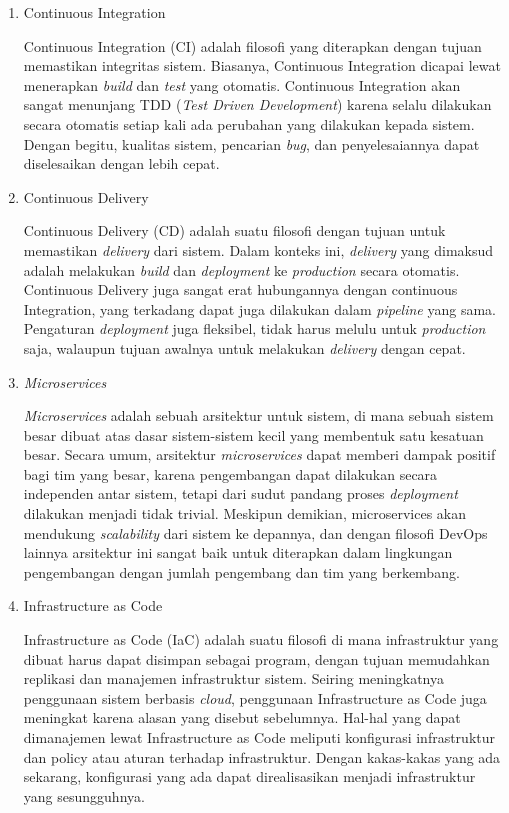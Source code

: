 \begin{enumerate}
  \item Continuous Integration
  
  Continuous Integration (CI) adalah filosofi yang diterapkan dengan tujuan memastikan integritas sistem.
  Biasanya, Continuous Integration dicapai lewat menerapkan \textit{build} dan \textit{test} yang otomatis.
  Continuous Integration akan sangat menunjang TDD (\textit{Test Driven Development}) karena selalu dilakukan secara otomatis setiap kali ada perubahan yang dilakukan kepada sistem.
  Dengan begitu, kualitas sistem, pencarian \textit{bug}, dan penyelesaiannya dapat diselesaikan dengan lebih cepat.

  \item Continuous Delivery
  
  Continuous Delivery (CD) adalah suatu filosofi dengan tujuan untuk memastikan \textit{delivery} dari sistem.
  Dalam konteks ini, \textit{delivery} yang dimaksud adalah melakukan \textit{build} dan \textit{deployment} ke \textit{production} secara otomatis.
  Continuous Delivery juga sangat erat hubungannya dengan continuous Integration, yang terkadang dapat juga dilakukan dalam \textit{pipeline} yang sama.
  Pengaturan \textit{deployment} juga fleksibel, tidak harus melulu untuk \textit{production} saja, walaupun tujuan awalnya untuk melakukan \textit{delivery} dengan cepat.

  \item \textit{Microservices}
  
  \textit{Microservices} adalah sebuah arsitektur untuk sistem, di mana sebuah sistem besar dibuat atas dasar sistem-sistem kecil yang membentuk satu kesatuan besar.
  Secara umum, arsitektur \textit{microservices} dapat memberi dampak positif bagi tim yang besar, karena pengembangan dapat dilakukan secara independen antar sistem, tetapi dari sudut pandang proses \textit{deployment} dilakukan menjadi tidak trivial.
  Meskipun demikian, microservices akan mendukung \textit{scalability} dari sistem ke depannya, dan dengan filosofi DevOps lainnya arsitektur ini sangat baik untuk diterapkan dalam lingkungan pengembangan dengan jumlah pengembang dan tim yang berkembang.

  \item Infrastructure as Code
  
  Infrastructure as Code (IaC) adalah suatu filosofi di mana infrastruktur yang dibuat harus dapat disimpan sebagai program, dengan tujuan memudahkan replikasi dan manajemen infrastruktur sistem.
  Seiring meningkatnya penggunaan sistem berbasis \textit{cloud}, penggunaan Infrastructure as Code juga meningkat karena alasan yang disebut sebelumnya.
  Hal-hal yang dapat dimanajemen lewat Infrastructure as Code meliputi konfigurasi infrastruktur dan policy atau aturan terhadap infrastruktur.
  Dengan kakas-kakas yang ada sekarang, konfigurasi yang ada dapat direalisasikan menjadi infrastruktur yang sesungguhnya.


\end{enumerate}
